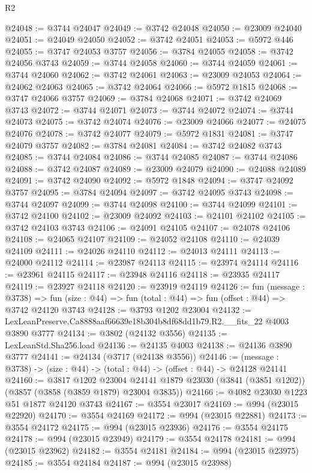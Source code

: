 \begin{lexlean}{R2}
\begin{coremodule}
@24048 := @3744 @24047
@24049 := @3742 @24048
@24050 := @23009 @24040
@24051 := @24049 @24050
@24052 := @3742 @24051
@24053 := @5972 @446
@24055 := @3747 @24053 @3757
@24056 := @3784 @24055
@24058 := @3742 @24056 @3743
@24059 := @3744 @24058
@24060 := @3744 @24059
@24061 := @3744 @24060
@24062 := @3742 @24061
@24063 := @23009 @24053
@24064 := @24062 @24063
@24065 := @3742 @24064
@24066 := @5972 @1815
@24068 := @3747 @24066 @3757
@24069 := @3784 @24068
@24071 := @3742 @24069 @3743
@24072 := @3744 @24071
@24073 := @3744 @24072
@24074 := @3744 @24073
@24075 := @3742 @24074
@24076 := @23009 @24066
@24077 := @24075 @24076
@24078 := @3742 @24077
@24079 := @5972 @1831
@24081 := @3747 @24079 @3757
@24082 := @3784 @24081
@24084 := @3742 @24082 @3743
@24085 := @3744 @24084
@24086 := @3744 @24085
@24087 := @3744 @24086
@24088 := @3742 @24087
@24089 := @23009 @24079
@24090 := @24088 @24089
@24091 := @3742 @24090
@24092 := @5972 @1848
@24094 := @3747 @24092 @3757
@24095 := @3784 @24094
@24097 := @3742 @24095 @3743
@24098 := @3744 @24097
@24099 := @3744 @24098
@24100 := @3744 @24099
@24101 := @3742 @24100
@24102 := @23009 @24092
@24103 := @24101 @24102
@24105 := @3742 @24103 @3743
@24106 := @24091 @24105
@24107 := @24078 @24106
@24108 := @24065 @24107
@24109 := @24052 @24108
@24110 := @24039 @24109
@24111 := @24026 @24110
@24112 := @24013 @24111
@24113 := @24000 @24112
@24114 := @23987 @24113
@24115 := @23974 @24114
@24116 := @23961 @24115
@24117 := @23948 @24116
@24118 := @23935 @24117
@24119 := @23927 @24118
@24120 := @23919 @24119
@24126 := fun (message : @3738) =>
  fun (size : @44) => fun (total : @44) => fun (offset : @44) => @3742 @24120 @3743
@24128 := @3793 @1202 @23004
@24132 := LexLeanPreserve.Ca8888aaf66639e18b304b8df68dd1b79.R2.__fits_22 @4003 @3890 @3777
@24134 := @3802 (@24132 @3556)
@24135 := LexLeanStd.Sha256.load
@24136 := @24135 @4003
@24138 := @24136 @3890 @3777
@24141 := @24134 (@3717 (@24138 @3556))
@24146 := (message : @3738) -> (size : @44) -> (total : @44) -> (offset : @44) -> @24128 @24141
@24160 := @3817
    @1202
    @23004
    @24141
    @1879
    @23030
    (@3841 (@3851 @1202))
    (@3857 (@3858 (@3859 @1879) @23004 @3835))
@24166 := @4082 @23030 @1223 @51 @1877 @24120 @3743
@24167 := @3554 @23017
@24169 := @994 (@23015 @22920)
@24170 := @3554 @24169
@24172 := @994 (@23015 @22881)
@24173 := @3554 @24172
@24175 := @994 (@23015 @23936)
@24176 := @3554 @24175
@24178 := @994 (@23015 @23949)
@24179 := @3554 @24178
@24181 := @994 (@23015 @23962)
@24182 := @3554 @24181
@24184 := @994 (@23015 @23975)
@24185 := @3554 @24184
@24187 := @994 (@23015 @23988)

\end{coremodule}
\end{lexlean}
